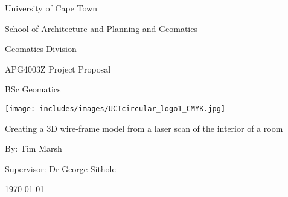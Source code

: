 \begin{center}
{\Huge University of Cape Town}
\linebreak \linebreak

{\LARGE School of Architecture and Planning and Geomatics}
\linebreak \linebreak

{\Large Geomatics Division}
\linebreak \linebreak


{\Large APG4003Z Project Proposal}
\linebreak

{\Large BSc Geomatics}
\linebreak \linebreak

\begin{center}
\texttt{[image: includes/images/UCTcircular\_logo1\_CMYK.jpg]}
\linebreak \linebreak
\end{center}

{\Large Creating a 3D wire-frame model from a laser scan of the interior of a room}
\linebreak \linebreak

{\Large By: Tim Marsh}
\linebreak \linebreak

{\Large Supervisor: Dr George Sithole}
\linebreak \linebreak

{\Large \today}

\end{center}
